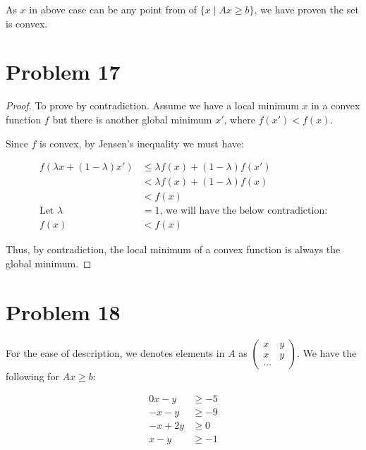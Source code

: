 \documentclass[12pt]{article}
\begin{document}
As $x$ in above case can be any point from of $\{x \mid Ax \geq b \}$, we have proven the set is convex.

\section{Problem 17}

\begin{proof}
To prove by contradiction. Assume we have a local minimum $x$ in a convex function $f$ but there is another global minimum $x'$, where $f(x') < f(x)$.

Since $f$ is convex, by Jensen's inequality we must have:

\begin{align*}
    f(\lambda x + (1 - \lambda)x') &\leq \lambda f(x) + (1 - \lambda)f(x') \\
    &< \lambda f(x) + (1 - \lambda)f(x) \\
    &< f(x) \\
    \text{Let \ } \lambda &= 1 \text{, we will have the below contradiction:} \\
    f(x) &< f(x)
\end{align*}

Thus, by contradiction, the local minimum of a convex function is always the global minimum.

\end{proof}

\section{Problem 18}

For the ease of description, we denotes elements in $A$ as $\begin{pmatrix}
  x & y \\
  x & y \\
  ...
\end{pmatrix}$. We have the following for $Ax \geq b$:


\begin{align*}
    0x -y &\geq -5 \\
    -x - y &\geq -9 \\
    -x + 2y &\geq 0 \\
    x - y &\geq -1
\end{align*}
\end{document}
